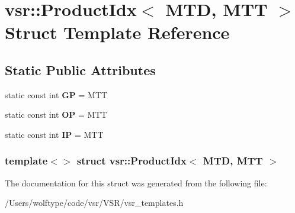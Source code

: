 \hypertarget{structvsr_1_1_product_idx_3_01_m_t_d_00_01_m_t_t_01_4}{\section{vsr\-:\-:Product\-Idx$<$ M\-T\-D, M\-T\-T $>$ Struct Template Reference}
\label{structvsr_1_1_product_idx_3_01_m_t_d_00_01_m_t_t_01_4}
}
\subsection*{Static Public Attributes}
\begin{DoxyCompactItemize}
\item 
\hypertarget{structvsr_1_1_product_idx_3_01_m_t_d_00_01_m_t_t_01_4_a2ccfa4b26a22e99aed6f0c3d27df8a96}{static const int {\bfseries G\-P} = M\-T\-T}\label{structvsr_1_1_product_idx_3_01_m_t_d_00_01_m_t_t_01_4_a2ccfa4b26a22e99aed6f0c3d27df8a96}

\item 
\hypertarget{structvsr_1_1_product_idx_3_01_m_t_d_00_01_m_t_t_01_4_ac1fe3096cf55c0befea7bcbc656c6622}{static const int {\bfseries O\-P} = M\-T\-T}\label{structvsr_1_1_product_idx_3_01_m_t_d_00_01_m_t_t_01_4_ac1fe3096cf55c0befea7bcbc656c6622}

\item 
\hypertarget{structvsr_1_1_product_idx_3_01_m_t_d_00_01_m_t_t_01_4_a62b1c62bce43609dde585577781ab54c}{static const int {\bfseries I\-P} = M\-T\-T}\label{structvsr_1_1_product_idx_3_01_m_t_d_00_01_m_t_t_01_4_a62b1c62bce43609dde585577781ab54c}

\end{DoxyCompactItemize}
\subsubsection*{template$<$$>$ struct vsr\-::\-Product\-Idx$<$ M\-T\-D, M\-T\-T $>$}



The documentation for this struct was generated from the following file\-:\begin{DoxyCompactItemize}
\item 
/\-Users/wolftype/code/vsr/\-V\-S\-R/vsr\-\_\-templates.\-h\end{DoxyCompactItemize}
